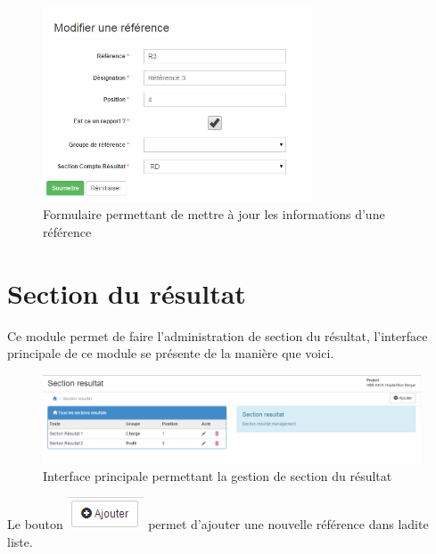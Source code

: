 \documentclass[12pt,a4paper]{report}
\begin{document}
\begin{figure}[h]
\begin{center}
\includegraphics[width=8cm]{pic/UptReference.png}
\end{center}
\caption{Formulaire permettant de mettre à jour les informations d'une référence}
\label{Formulaire permettant de mettre à jour les informations d'une référence}
\end{figure} 

\newpage
\section{Section du résultat}
Ce module permet de faire l'administration de section du résultat, l'interface principale de ce module se présente de la manière que voici.

\begin{figure}[h]
\begin{center}
\includegraphics[width=14cm]{pic/SectionResultat.png}
\end{center}
\caption{Interface principale permettant la gestion de section du résultat}
\label{Interface principale permettant la gestion de section du résultat}
\end{figure}

Le bouton \includegraphics[scale=0.7]{pic/AddNewStore.png} permet d'ajouter une nouvelle référence dans ladite liste.
\end{document}

